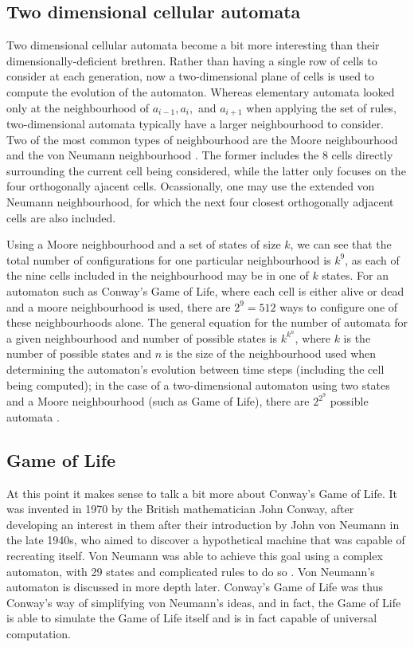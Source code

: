 \documentclass[11pt,a4paper]{article}
\begin{document}
    \subsection{Two dimensional cellular automata}
    Two dimensional cellular automata become a bit more interesting than their
    dimensionally-deficient brethren. Rather than having a single row of cells
    to consider at each generation, now a two-dimensional plane of cells is used
    to compute the evolution of the automaton. Whereas elementary automata
    looked only at the neighbourhood of $a_{i-1}, a_i,$ and $a_{i+1}$ when
    applying the set of rules, two-dimensional automata typically have a larger
    neighbourhood to consider. Two of the most common types of neighbourhood are
    the Moore neighbourhood and the von Neumann neighbourhood
    \cite{neighbourhoods}. The former includes the 8 cells directly surrounding
    the current cell being considered, while the latter only focuses on the four
    orthogonally ajacent cells. Ocassionally, one may use the extended von
    Neumann neighbourhood, for which the next four closest orthogonally adjacent
    cells are also included.

    Using a Moore neighbourhood and a set of states of size $k$, we can see that
    the total number of configurations for one particular neighbourhood is
    $k^9$, as each of the nine cells included in the neighbourhood may be in one
    of $k$ states. For an automaton such as Conway's Game of Life, where each
    cell is either alive or dead and a moore neighbourhood is used, there are
    $2^9=512$ ways to configure one of these neighbourhoods alone. The general
    equation for the number of automata for a given neighbourhood and number of
    possible states is $k^{k^n}$, where $k$ is the number of possible states and
    $n$ is the size of the neighbourhood used when determining the automaton's
    evolution between time steps (including the cell being computed); in the
    case of a two-dimensional automaton using two states and a Moore
    neighbourhood (such as Game of Life), there are $2^{2^9}$ possible automata
    \cite{num_rules}.

    \subsection{Game of Life}
    At this point it makes sense to talk a bit more about Conway's Game of Life.
    It was invented in 1970 by the British mathematician John Conway, after
    developing an interest in them after their introduction by John von Neumann
    in the late 1940s, who aimed to discover a hypothetical machine that was
    capable of recreating itself. Von Neumann was able to achieve this goal
    using a complex automaton, with 29 states and complicated rules to do so
    \cite{self-reproducing}. Von Neumann's automaton is discussed in more depth
    later. Conway's Game of Life was thus Conway's way of simplifying von
    Neumann's ideas, and in fact, the Game of Life is able to simulate the Game
    of Life itself and is in fact capable of universal computation.
\end{document}

